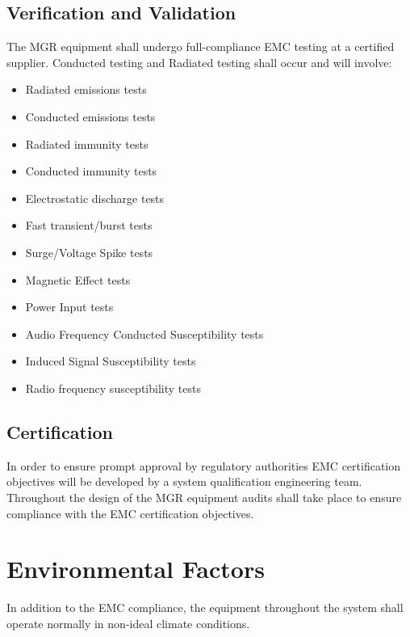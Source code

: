\documentclass[11pt]{article}
\begin{document}
		\subsection{Verification and Validation}
		The MGR equipment shall undergo full-compliance EMC testing at a certified supplier. Conducted testing and Radiated testing shall occur and will involve:
			\begin{itemize}
				
				\item Radiated emissions tests	
				
				\item Conducted emissions tests	
				
				\item Radiated immunity tests	
				
				\item Conducted immunity tests	
				
				\item Electrostatic discharge tests
				
				\item Fast transient/burst tests

				\item Surge/Voltage Spike tests
				
				\item Magnetic Effect tests
				
				\item Power Input tests
				
				\item Audio Frequency Conducted Susceptibility tests
				
				\item Induced Signal Susceptibility tests
				
				\item Radio frequency susceptibility tests

			\end{itemize}

		\subsection{Certification}
		In order to ensure prompt approval by regulatory authorities EMC certification objectives will be developed by a system qualification engineering team. Throughout the design of the MGR equipment audits shall take place to ensure compliance with the EMC certification objectives.

	\section{Environmental Factors}
	In addition to the EMC compliance, the equipment throughout the system shall operate normally in non-ideal climate conditions.
\end{document}

